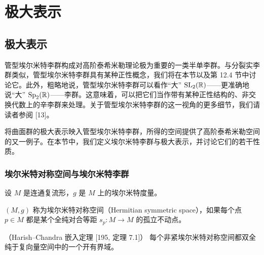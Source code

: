 
\chapter{极大表示}



\section{极大表示}

管型埃尔米特李群构成对高阶泰希米勒理论极为重要的一类半单李群。与分裂实李群类似，管型埃尔米特李群具有某种正性概念，我们将在本节以及第 12.4 节中讨论它。此外，粗略地说，管型埃尔米特李群可以看作“大” $\operatorname{SL}_2(\mathbb{R})$——更准确地说“大” $\operatorname{Sp}_2(\mathbb{R})$——李群。这意味着，可以把它们当作带有某种正性结构的、非交换代数上的辛李群来处理。关于管型埃尔米特李群的这一视角的更多细节，我们请读者参阅 [13]。

将曲面群的极大表示映入管型埃尔米特李群，所得的空间提供了高阶泰希米勒空间的又一例子。在本节中，我们定义埃尔米特李群与极大表示，并讨论它们的若干性质。

\subsection{埃尔米特对称空间与埃尔米特李群}

设 $M$ 是连通复流形，$g$ 是 $M$ 上的埃尔米特度量。


\begin{definition}[11.1]
$(M,g)$ 称为埃尔米特对称空间（Hermitian symmetric space），如果每个点 $p\in M$ 都是某个全纯对合等距 $s_p\colon M\to M$ 的孤立不动点。
\end{definition}

\begin{theorem}[11.2]（Harish--Chandra 嵌入定理 {[195, 定理 7.1]}）
每个非紧埃尔米特对称空间都双全纯于复向量空间中的一个开有界域。
\end{theorem}

